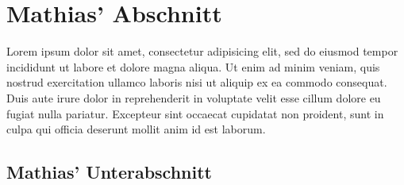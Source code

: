 \section{Mathias' Abschnitt}
\renewcommand\mitautor{Mathias' XXXXXX}

Lorem ipsum dolor sit amet, consectetur adipisicing elit, sed do eiusmod
tempor incididunt ut labore et dolore magna aliqua. Ut enim ad minim veniam,
quis nostrud exercitation ullamco laboris nisi ut aliquip ex ea commodo
consequat. Duis aute irure dolor in reprehenderit in voluptate velit esse
cillum dolore eu fugiat nulla pariatur. Excepteur sint occaecat cupidatat non
proident, sunt in culpa qui officia deserunt mollit anim id est laborum.

\subsection{Mathias' Unterabschnitt}


\newpage
